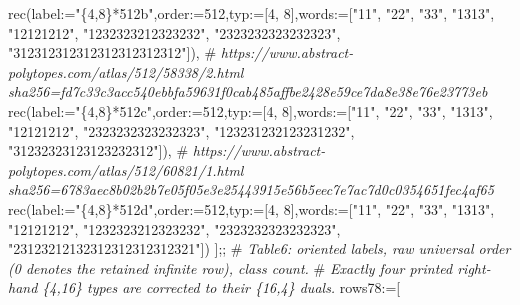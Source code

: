 \documentclass[
  10pt,
  letterpaper,
]{article}
\newenvironment{Shaded}{}{}
\newcommand{\CommentTok}[1]{\textcolor[rgb]{0.38,0.63,0.69}{\textit{#1}}}
\newcommand{\ExtensionTok}[1]{#1}
\newcommand{\FloatTok}[1]{\textcolor[rgb]{0.25,0.63,0.44}{#1}}
\newcommand{\NormalTok}[1]{#1}
\newcommand{\OperatorTok}[1]{\textcolor[rgb]{0.40,0.40,0.40}{#1}}
\newcommand{\StringTok}[1]{\textcolor[rgb]{0.25,0.44,0.63}{#1}}
\newcommand{\VariableTok}[1]{\textcolor[rgb]{0.10,0.09,0.49}{#1}}
\begin{document}
\begin{Shaded}
\begin{Highlighting}[]
\ExtensionTok{rec}\NormalTok{(}\VariableTok{label}\OperatorTok{:=}\StringTok{"\{4,8\}*512b"}\OperatorTok{,}\VariableTok{order}\OperatorTok{:=}\FloatTok{512}\OperatorTok{,}\VariableTok{typ}\OperatorTok{:=}\NormalTok{[}\FloatTok{4}\OperatorTok{,} \FloatTok{8}\NormalTok{]}\OperatorTok{,}\VariableTok{words}\OperatorTok{:=}\NormalTok{[}\StringTok{"11"}\OperatorTok{,} \StringTok{"22"}\OperatorTok{,} \StringTok{"33"}\OperatorTok{,} \StringTok{"1313"}\OperatorTok{,} \StringTok{"12121212"}\OperatorTok{,} \StringTok{"1232323212323232"}\OperatorTok{,} \StringTok{"2323232323232323"}\OperatorTok{,} \StringTok{"312312312312312312312312"}\NormalTok{])}\OperatorTok{,}
\NormalTok{\#}\CommentTok{ https://www.abstract{-}polytopes.com/atlas/512/58338/2.html sha256=fd7c33c3acc540ebbfa59631f0cab485affbe2428e59ce7da8e38e76e23773eb}
\ExtensionTok{rec}\NormalTok{(}\VariableTok{label}\OperatorTok{:=}\StringTok{"\{4,8\}*512c"}\OperatorTok{,}\VariableTok{order}\OperatorTok{:=}\FloatTok{512}\OperatorTok{,}\VariableTok{typ}\OperatorTok{:=}\NormalTok{[}\FloatTok{4}\OperatorTok{,} \FloatTok{8}\NormalTok{]}\OperatorTok{,}\VariableTok{words}\OperatorTok{:=}\NormalTok{[}\StringTok{"11"}\OperatorTok{,} \StringTok{"22"}\OperatorTok{,} \StringTok{"33"}\OperatorTok{,} \StringTok{"1313"}\OperatorTok{,} \StringTok{"12121212"}\OperatorTok{,} \StringTok{"2323232323232323"}\OperatorTok{,} \StringTok{"123231232123231232"}\OperatorTok{,} \StringTok{"31232323123123232312"}\NormalTok{])}\OperatorTok{,}
\NormalTok{\#}\CommentTok{ https://www.abstract{-}polytopes.com/atlas/512/60821/1.html sha256=6783aec8b02b2b7e05f05e3e25443915e56b5eec7e7ac7d0c0354651fec4af65}
\ExtensionTok{rec}\NormalTok{(}\VariableTok{label}\OperatorTok{:=}\StringTok{"\{4,8\}*512d"}\OperatorTok{,}\VariableTok{order}\OperatorTok{:=}\FloatTok{512}\OperatorTok{,}\VariableTok{typ}\OperatorTok{:=}\NormalTok{[}\FloatTok{4}\OperatorTok{,} \FloatTok{8}\NormalTok{]}\OperatorTok{,}\VariableTok{words}\OperatorTok{:=}\NormalTok{[}\StringTok{"11"}\OperatorTok{,} \StringTok{"22"}\OperatorTok{,} \StringTok{"33"}\OperatorTok{,} \StringTok{"1313"}\OperatorTok{,} \StringTok{"12121212"}\OperatorTok{,} \StringTok{"1232323212323232"}\OperatorTok{,} \StringTok{"2323232323232323"}\OperatorTok{,} \StringTok{"23123212132312312312312321"}\NormalTok{])}
\NormalTok{]}\OperatorTok{;;}
\NormalTok{\#}\CommentTok{ Table6: oriented labels, raw universal order (0 denotes the retained infinite row), class count.}
\NormalTok{\#}\CommentTok{ Exactly four printed right{-}hand \{4,16\} types are corrected to their \{16,4\} duals.}
\VariableTok{rows78}\OperatorTok{:=}\NormalTok{[}

\end{Highlighting}
\end{Shaded}
\end{document}
